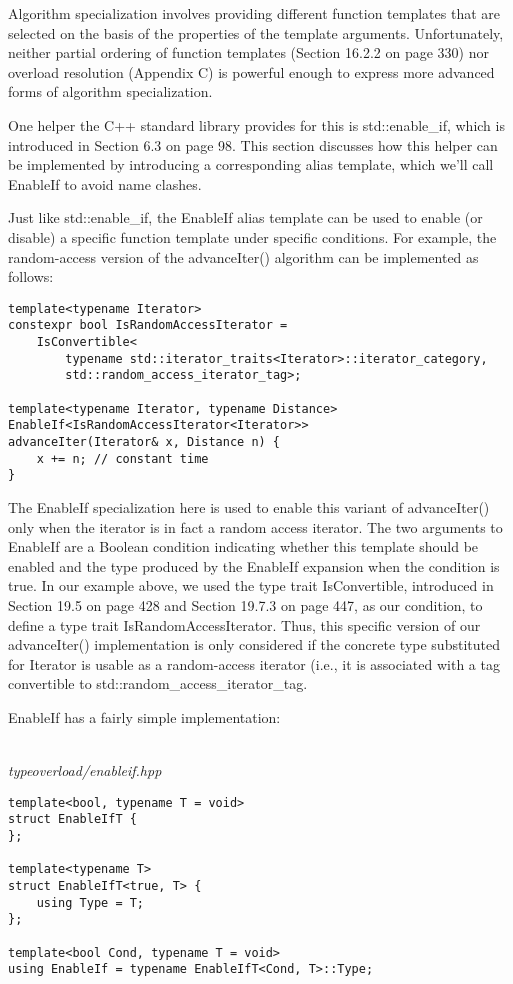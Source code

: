 
Algorithm specialization involves providing different function templates that are selected on the basis of the properties of the template arguments. Unfortunately, neither partial ordering of function templates (Section 16.2.2 on page 330) nor overload resolution (Appendix C) is powerful enough to express more advanced forms of algorithm specialization.

One helper the C++ standard library provides for this is std::enable\_if, which is introduced in Section 6.3 on page 98. This section discusses how this helper can be implemented by introducing a corresponding alias template, which we’ll call EnableIf to avoid name clashes.

Just like std::enable\_if, the EnableIf alias template can be used to enable (or disable) a specific function template under specific conditions. For example, the random-access version of the advanceIter() algorithm can be implemented as follows:

\begin{lstlisting}[style=styleCXX]
template<typename Iterator>
constexpr bool IsRandomAccessIterator =
	IsConvertible<
		typename std::iterator_traits<Iterator>::iterator_category,
		std::random_access_iterator_tag>;
		
template<typename Iterator, typename Distance>
EnableIf<IsRandomAccessIterator<Iterator>>
advanceIter(Iterator& x, Distance n) {
	x += n; // constant time
}
\end{lstlisting}

The EnableIf specialization here is used to enable this variant of advanceIter() only when the iterator is in fact a random access iterator. The two arguments to EnableIf are a Boolean condition indicating whether this template should be enabled and the type produced by the EnableIf expansion when the condition is true. In our example above, we used the type trait IsConvertible, introduced in Section 19.5 on page 428 and Section 19.7.3 on page 447, as our condition, to define a type trait IsRandomAccessIterator. Thus, this specific version of our advanceIter() implementation is only considered if the concrete type substituted for Iterator is usable as a random-access iterator (i.e., it is associated with a tag convertible to std::random\_access\_iterator\_tag.

EnableIf has a fairly simple implementation:

\hspace*{\fill} \\ %
\noindent
\textit{typeoverload/enableif.hpp}
\begin{lstlisting}[style=styleCXX]
template<bool, typename T = void>
struct EnableIfT {
};

template<typename T>
struct EnableIfT<true, T> {
	using Type = T;
};

template<bool Cond, typename T = void>
using EnableIf = typename EnableIfT<Cond, T>::Type;
\end{lstlisting}

